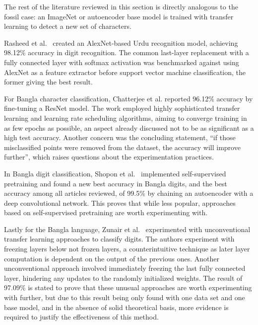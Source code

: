\documentclass[english,twoside,openright]{UH_DS_MSc}
\begin{document}
The rest of the literature reviewed in this section is directly analogous 
to the fossil case: an ImageNet or autoencoder base model is trained with transfer learning to detect a new set of characters.

Rasheed et al.~\cite{5rasheedHandwrittenUrduWAlexNet} created an AlexNet-based Urdu recognition 
model, achieving 98.12\% accuracy in digit recognition. The common last-layer replacement 
with a fully connected layer with softmax activation was benchmarked against using AlexNet as 
a feature extractor before support vector 
machine classification, the former giving the best result.

For Bangla character classification, Chatterjee et al. reported 96.12\% accuracy 
by fine-tuning a ResNet model. The work employed highly sophisticated transfer
 learning and learning rate scheduling algorithms, aiming to converge training in as 
 few epochs as possible, an aspect already discussed not to be as significant as a high test accuracy.
  Another concern was the concluding statement, ``if those misclassified points were 
  removed from the dataset, the accuracy will improve further'', which raises questions about the experimentation practices.

In Bangla digit classification, Shopon et al.~\cite{6shoponBangla} implemented self-supervised 
pretraining and found a new best accuracy in Bangla digits,
and the best accuracy among all articles reviewed, of 99.5\% by chaining an autoencoder
with a deep convolutional network. This proves that while less popular, approaches based on self-supervised pretraining are worth experimenting with.

Lastly for the Bangla language, Zunair et al.~\cite{11zunairUnconventionalWisdom} experimented 
with unconventional transfer learning approaches to classify digits.
The authors experiment with freezing layers below not frozen layers, a counterintuitive 
technique as later layer computation is dependent on the output of the previous ones.
Another unconventional approach involved immediately freezing the last fully connected layer, 
hindering any updates to the randomly initialized weights. The result of 97.09\% is stated 
to prove that these unusual approaches are worth experimenting with further, but due to this 
result being only found with one data set and one base model, and in the absence of solid 
theoretical basis, more evidence is required to justify the effectiveness of this method.
\end{document}
